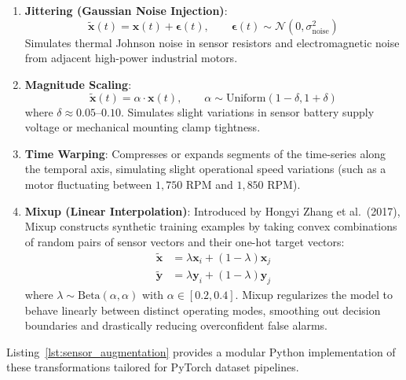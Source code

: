 \begin{enumerate}
    \item \textbf{Jittering (Gaussian Noise Injection)}:
    \begin{equation}
    \tilde{\mathbf{x}}(t) = \mathbf{x}(t) + \boldsymbol{\epsilon}(t), \qquad \boldsymbol{\epsilon}(t) \sim \mathcal{N}(0, \sigma_{\text{noise}}^2)\label{eq:jittering}
    \end{equation}
    Simulates thermal Johnson noise in sensor resistors and electromagnetic noise from adjacent high-power industrial motors.
    \item \textbf{Magnitude Scaling}:
    \begin{equation}
    \tilde{\mathbf{x}}(t) = \alpha \cdot \mathbf{x}(t), \qquad \alpha \sim \text{Uniform}(1 - \delta, 1 + \delta)\label{eq:scaling}
    \end{equation}
    where $\delta \approx 0.05\text{--}0.10$. Simulates slight variations in sensor battery supply voltage or mechanical mounting clamp tightness.
    \item \textbf{Time Warping}: Compresses or expands segments of the time-series along the temporal axis, simulating slight operational speed variations (such as a motor fluctuating between $1{,}750\text{ RPM}$ and $1{,}850\text{ RPM}$).
    \item \textbf{Mixup (Linear Interpolation)}: Introduced by Hongyi Zhang et al.~(2017), Mixup constructs synthetic training examples by taking convex combinations of random pairs of sensor vectors and their one-hot target vectors:
    \begin{align}
    \tilde{\mathbf{x}} &= \lambda \mathbf{x}_i + (1 - \lambda) \mathbf{x}_j\label{eq:mixup_x} \\
    \tilde{\mathbf{y}} &= \lambda \mathbf{y}_i + (1 - \lambda) \mathbf{y}_j\label{eq:mixup_y}
    \end{align}
    where $\lambda \sim \text{Beta}(\alpha, \alpha)$ with $\alpha \in [0.2, 0.4]$. Mixup regularizes the model to behave linearly between distinct operating modes, smoothing out decision boundaries and drastically reducing overconfident false alarms.
\end{enumerate}

Listing~\ref{lst:sensor_augmentation} provides a modular Python implementation of these transformations tailored for PyTorch dataset pipelines.

